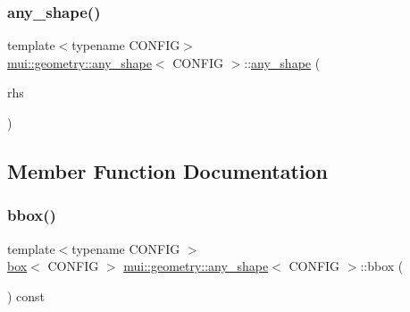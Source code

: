 \mbox{\label{classmui_1_1geometry_1_1any__shape_a9136caaea6ffd611d1aeced0cd9297dc}} 
\subsubsection{\texorpdfstring{any\+\_\+shape()}{any\_shape()}\hspace{0.1cm}{\footnotesize\ttfamily [4/4]}}
{\footnotesize\ttfamily template$<$typename C\+O\+N\+F\+IG$>$ \\
\hyperlink{classmui_1_1geometry_1_1any__shape}{mui\+::geometry\+::any\+\_\+shape}$<$ C\+O\+N\+F\+IG $>$\+::\hyperlink{classmui_1_1geometry_1_1any__shape}{any\+\_\+shape} (\begin{DoxyParamCaption}\item[{const \hyperlink{classmui_1_1geometry_1_1shape}{shape}$<$ C\+O\+N\+F\+IG $>$ \&}]{rhs }\end{DoxyParamCaption})\hspace{0.3cm}{\ttfamily [inline]}}



\subsection{Member Function Documentation}
\mbox{\label{classmui_1_1geometry_1_1any__shape_ad05e91914ca393723f5651cf57c99775}} 
\subsubsection{\texorpdfstring{bbox()}{bbox()}}
{\footnotesize\ttfamily template$<$typename C\+O\+N\+F\+IG $>$ \\
\hyperlink{classmui_1_1geometry_1_1box}{box}$<$ C\+O\+N\+F\+IG $>$ \hyperlink{classmui_1_1geometry_1_1any__shape}{mui\+::geometry\+::any\+\_\+shape}$<$ C\+O\+N\+F\+IG $>$\+::bbox (\begin{DoxyParamCaption}{ }\end{DoxyParamCaption}) const}

